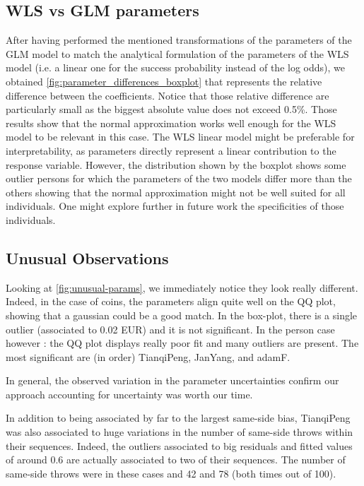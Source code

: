 \documentclass[a4paper, 12pt,oneside]{article}
\begin{document}
		\subsection{WLS vs GLM parameters}
		After having performed the mentioned transformations of the parameters of the GLM model to match the analytical formulation of the parameters of the WLS model (i.e. a linear one for the success probability instead of the log odds), we obtained \ref{fig:parameter_differences_boxplot} that represents the relative difference between the coefficients. Notice that those relative difference are particularly small as the biggest absolute value does not exceed 0.5\%. Those results show that the normal approximation works well enough for the WLS model to be relevant in this case. The WLS linear model might be preferable for interpretability, as parameters directly represent a linear contribution to the response variable. However, the distribution shown by the boxplot shows some outlier persons for which the parameters of the two models differ more than the others showing that the normal approximation might not be well suited for all individuals. One might explore further in future work the specificities of those individuals.  

		\subsection{Unusual Observations}\label{sec:unusual-observations}
			Looking at \ref{fig:unusual-params}, we immediately notice they look really different. Indeed, in the case of coins, the parameters align quite well on the QQ plot, showing that a gaussian could be a good match. In the box-plot, there is a single outlier (associated to 0.02 EUR) and it is not significant. In the person case however : the QQ plot displays really poor fit and  many outliers are present. The most significant are (in order) TianqiPeng, JanYang, and adamF. 

			In general, the observed variation in the parameter uncertainties confirm our approach accounting for uncertainty was worth our time. 

			In addition to being associated by far to the largest same-side bias, TianqiPeng was also associated to huge variations in the number of same-side throws within their sequences. Indeed, the outliers associated to big residuals and fitted values of around 0.6 are actually associated to two of their sequences. The number of same-side throws were in these cases and 42 and 78 (both times out of 100). 
\end{document}
